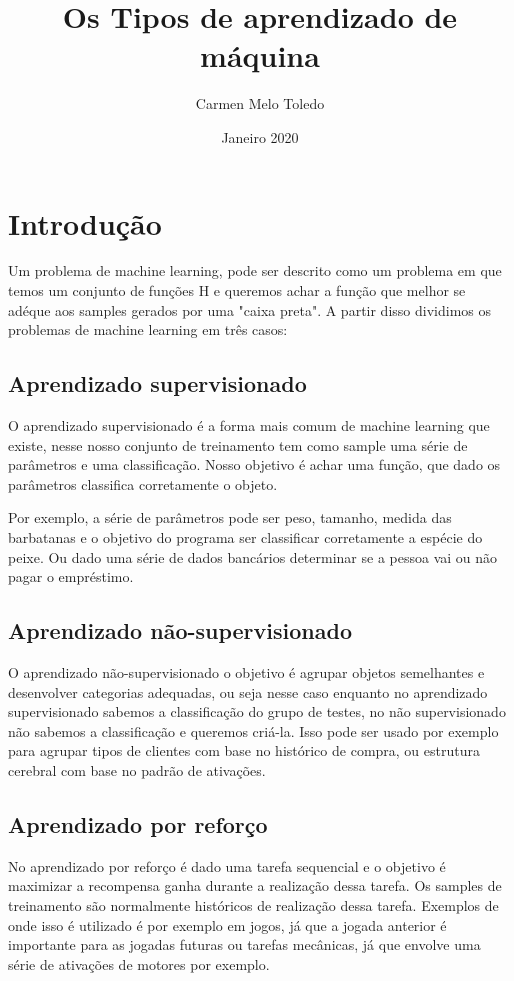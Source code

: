 \documentclass{article}
\title{Os Tipos de aprendizado de máquina}
\author{Carmen Melo Toledo}
\date{Janeiro 2020}
\begin{document}
\maketitle

\section{Introdução}

Um problema de machine learning, pode ser descrito como um problema em que temos um conjunto de funções H e queremos achar a função que melhor se adéque aos samples gerados por uma "caixa preta". A partir disso dividimos os problemas de machine learning em três casos:

\subsection{Aprendizado supervisionado}

O aprendizado supervisionado é a forma mais comum de machine learning que existe, nesse nosso conjunto de treinamento tem como sample uma série de parâmetros e uma classificação. Nosso objetivo é achar uma função, que dado os parâmetros classifica corretamente o objeto.

Por exemplo, a série de parâmetros pode ser peso, tamanho, medida das barbatanas e o objetivo do programa ser classificar corretamente a espécie do peixe. Ou dado uma série de dados bancários determinar se a pessoa vai ou não pagar o empréstimo.

\subsection{Aprendizado não-supervisionado}

O aprendizado não-supervisionado o objetivo é agrupar objetos semelhantes e desenvolver categorias adequadas, ou seja nesse caso enquanto no aprendizado supervisionado sabemos a classificação do grupo de testes, no não supervisionado não sabemos a classificação e queremos criá-la. Isso pode ser usado por exemplo para agrupar tipos de clientes com base no histórico de compra, ou estrutura cerebral com base no padrão de ativações.

\subsection{Aprendizado por reforço}

No aprendizado por reforço é dado uma tarefa sequencial e o objetivo é maximizar a recompensa ganha durante a realização dessa tarefa. Os samples de treinamento são normalmente históricos de realização dessa tarefa. Exemplos de onde isso é utilizado é por exemplo em jogos, já que a jogada anterior é importante para as jogadas futuras ou tarefas mecânicas, já que envolve uma série de ativações de motores por exemplo.
\end{document}
